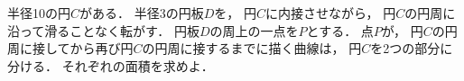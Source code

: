 \documentclass[../../main.tex]{subfiles}
\begin{document}
半径10の円$C$がある．
半径3の円板$D$を，
円$C$に内接させながら，
円$C$の円周に沿って滑ることなく転がす．
円板$D$の周上の一点を$P$とする．
点$P$が，
円$C$の円周に接してから再び円$C$の円周に接するまでに描く曲線は，
円$C$を2つの部分に分ける．
それぞれの面積を求めよ．
\end{document}
